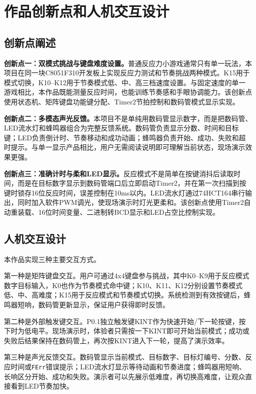 ﻿\documentclass[UTF8,a4paper,12pt]{ctexart}
\begin{document}
\section{作品创新点和人机交互设计}

\subsection{创新点阐述}
\textbf{创新点一：双模式挑战与键盘难度设置。}普通反应力小游戏通常只有单一玩法，本项目在同一块C8051F310开发板上实现反应力测试和节奏挑战两种模式。K15用于模式切换，K10--K12用于节奏模式低、中、高三档速度设置。与固定速度的单一游戏相比，本作品既能测量反应时间，也能训练节奏感和手眼协调能力。该创新点使用状态机、矩阵键盘功能键分配、Timer2节拍控制和数码管模式显示实现。

\textbf{创新点二：多模态声光反馈。}本项目不是单纯用数码管显示数字，而是把数码管、LED流水灯和蜂鸣器组合为完整反馈系统。数码管负责显示分数、时间和目标键；LED负责倒计时、节奏移动和成功动画；蜂鸣器负责开始、成功、失败和超时提示。与单一显示产品相比，用户无需阅读说明即可理解当前状态，现场演示效果更强。

\textbf{创新点三：准确计时与柔和LED显示。}反应模式不是简单在按键消抖后读取时间，而是在目标数字显示到数码管端口后立即启动Timer2，并在第一次扫描到按键时锁存16位反应时间，误差控制在10ms以内。LED流水灯通过74HCT164串行输出，同时加入软件PWM调光，使现场演示时灯光更柔和。该创新点使用Timer2自动重装载、16位时间变量、二进制转BCD显示和LED占空比控制实现。

\subsection{人机交互设计}
本作品实现三种主要交互方式。

第一种是矩阵键盘交互。用户可通过4x4键盘参与挑战，其中K0--K9用于反应模式数字目标输入，K0也作为节奏模式命中键；K10、K11、K12分别设置节奏模式低、中、高难度；K15用于反应模式和节奏模式切换。系统检测到有效按键后，蜂鸣器短响，数码管更新显示，保证用户获得即时反馈。

第二种是外部触发键交互。P0.1独立触发键KINT作为快速开始/下一轮按键，按下时为低电平。现场演示时，体验者只需按一下KINT即可开始当前模式；成功或失败后结果保持在数码管上，再次按KINT进入下一轮，提高了演示效率。

第三种是声光反馈交互。数码管显示当前模式、目标数字、目标灯编号、分数、反应时间或\texttt{FErr}错误提示；LED流水灯显示等待动画和节奏进度；蜂鸣器用短响、长响区分开始、成功和失败。演示者可以先展示低难度，再切换高难度，让观众直接看到LED节奏加快。
\end{document}
